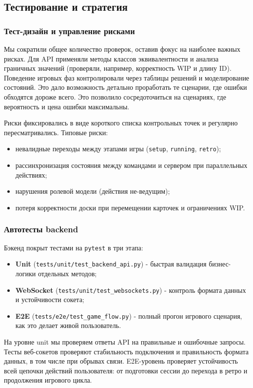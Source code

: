 \subsection{Тестирование и стратегия}
\subsubsection{Тест-дизайн и управление рисками} 
Мы сократили общее количество проверок, оставив фокус на наиболее важных рисках. Для API применяли методы классов эквивалентности и анализа граничных значений (проверяли, например, корректность WIP и длину ID). Поведение игровых фаз контролировали через таблицы решений и моделирование состояний. Это дало возможность детально проработать те сценарии, где ошибки обходятся дороже всего. Это позволило сосредоточиться на сценариях, где вероятность и цена ошибки максимальны.

Риски фиксировались в виде короткого списка контрольных точек и регулярно пересматривались. Типовые риски:

\begin{itemize}
    \item невалидные переходы между этапами игры (\texttt{setup}, \texttt{running}, \texttt{retro});
    \item рассинхронизация состояния между командами и сервером при параллельных действиях;
    \item нарушения ролевой модели (действия не-ведущим);
    \item потеря корректности доски при перемещении карточек и ограничениях WIP.
\end{itemize}

\subsubsection{Автотесты backend} 
Бэкенд покрыт тестами на \texttt{pytest} в три этапа:
\begin{itemize}
    \item \textbf{Unit} (\texttt{tests/unit/test\_backend\_api.py}) - быстрая валидация бизнес-логики отдельных методов;
    \item \textbf{WebSocket} (\texttt{tests/unit/test\_websockets.py}) - контроль формата данных и устойчивости сокета;
    \item \textbf{E2E} (\texttt{tests/e2e/test\_game\_flow.py}) - полный прогон игрового сценария, как это делает живой пользователь.
\end{itemize}
На уровне unit мы проверяем ответы API на правильные и ошибочные запросы. Тесты веб-сокетов проверяют стабильность подключения и правильность формата данных, в том числе при обрывах связи. E2E-уровень проверяет устойчивость всей цепочки действий пользователя: от подготовки сессии до перехода в ретро и продолжения игрового цикла.

